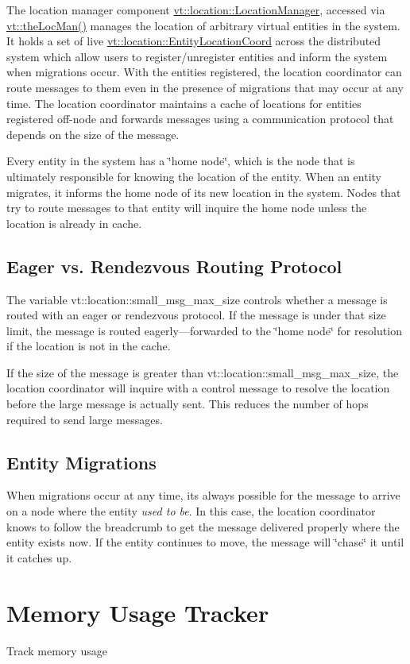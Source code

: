 The location manager component {\ttfamily \hyperlink{structvt_1_1location_1_1_location_manager}{vt\+::location\+::\+Location\+Manager}}, accessed via {\ttfamily \hyperlink{namespacevt_ace1c9d64e09732e3b7414d02517ecfdb}{vt\+::the\+Loc\+Man()}} manages the location of arbitrary virtual entities in the system. It holds a set of live {\ttfamily \hyperlink{structvt_1_1location_1_1_entity_location_coord}{vt\+::location\+::\+Entity\+Location\+Coord}} across the distributed system which allow users to register/unregister entities and inform the system when migrations occur. With the entities registered, the location coordinator can route messages to them even in the presence of migrations that may occur at any time. The location coordinator maintains a cache of locations for entities registered off-\/node and forwards messages using a communication protocol that depends on the size of the message.

Every entity in the system has a \char`\"{}home node\char`\"{}, which is the node that is ultimately responsible for knowing the location of the entity. When an entity migrates, it informs the home node of its new location in the system. Nodes that try to route messages to that entity will inquire the home node unless the location is already in cache.\hypertarget{location_comm-protocol}{}\subsection{Eager vs. Rendezvous Routing Protocol}\label{location_comm-protocol}
The variable {\ttfamily vt\+::location\+::small\+\_\+msg\+\_\+max\+\_\+size} controls whether a message is routed with an eager or rendezvous protocol. If the message is under that size limit, the message is routed eagerly---forwarded to the \char`\"{}home node\char`\"{} for resolution if the location is not in the cache.

If the size of the message is greater than {\ttfamily vt\+::location\+::small\+\_\+msg\+\_\+max\+\_\+size}, the location coordinator will inquire with a control message to resolve the location before the large message is actually sent. This reduces the number of hops required to send large messages.\hypertarget{location_location-migrations}{}\subsection{Entity Migrations}\label{location_location-migrations}
When migrations occur at any time, it\textquotesingle{}s always possible for the message to arrive on a node where the entity {\itshape used to be}. In this case, the location coordinator knows to follow the breadcrumb to get the message delivered properly where the entity exists now. If the entity continues to move, the message will \char`\"{}chase\char`\"{} it until it catches up. \hypertarget{mem-usage}{}\section{Memory Usage Tracker}\label{mem-usage}
Track memory usage

